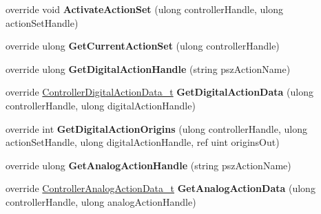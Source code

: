 \begin{DoxyCompactItemize}
\item 
\mbox{\label{class_valve_1_1_steamworks_1_1_c_steam_controller_a1980b420a0d3bb3b9d39592fa936d15f}} 
override void {\bfseries Activate\+Action\+Set} (ulong controller\+Handle, ulong action\+Set\+Handle)
\item 
\mbox{\label{class_valve_1_1_steamworks_1_1_c_steam_controller_a03dcac28161abbab2e365bf246da58d4}} 
override ulong {\bfseries Get\+Current\+Action\+Set} (ulong controller\+Handle)
\item 
\mbox{\label{class_valve_1_1_steamworks_1_1_c_steam_controller_a41628ff4be67ecbfcb9a6f37ec8da50e}} 
override ulong {\bfseries Get\+Digital\+Action\+Handle} (string psz\+Action\+Name)
\item 
\mbox{\label{class_valve_1_1_steamworks_1_1_c_steam_controller_a343ab9be92625f7133dddf9f1de49c14}} 
override \hyperlink{struct_valve_1_1_steamworks_1_1_controller_digital_action_data__t}{Controller\+Digital\+Action\+Data\+\_\+t} {\bfseries Get\+Digital\+Action\+Data} (ulong controller\+Handle, ulong digital\+Action\+Handle)
\item 
\mbox{\label{class_valve_1_1_steamworks_1_1_c_steam_controller_ad31daedb825ae1e4e7ce4adaf5adb415}} 
override int {\bfseries Get\+Digital\+Action\+Origins} (ulong controller\+Handle, ulong action\+Set\+Handle, ulong digital\+Action\+Handle, ref uint origins\+Out)
\item 
\mbox{\label{class_valve_1_1_steamworks_1_1_c_steam_controller_a985080377f4f24ffb271e8e6d6b46888}} 
override ulong {\bfseries Get\+Analog\+Action\+Handle} (string psz\+Action\+Name)
\item 
\mbox{\label{class_valve_1_1_steamworks_1_1_c_steam_controller_a0f3ca53406ec48bd814786be905d8b9c}} 
override \hyperlink{struct_valve_1_1_steamworks_1_1_controller_analog_action_data__t}{Controller\+Analog\+Action\+Data\+\_\+t} {\bfseries Get\+Analog\+Action\+Data} (ulong controller\+Handle, ulong analog\+Action\+Handle)

\end{DoxyCompactItemize}
